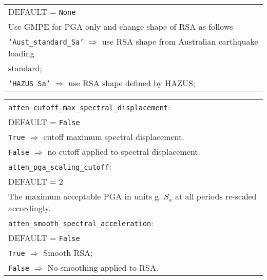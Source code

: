 \begin{tabular}{|p{\textwidth}|}
DEFAULT = \texttt{None} \\
Use GMPE for PGA only and change shape of RSA as follows\\
 \hspace{0.5em} \texttt{`Aust\_standard\_Sa'} $\Rightarrow$
use RSA shape from Australian earthquake loading \\
\hspace{11em} standard; \\
 \hspace{0.5em} \texttt{`HAZUS\_Sa'}  $\Rightarrow$ use RSA shape defined by HAZUS;\\
\hline
\end{tabular}

\begin{tabular}{|p{\textwidth}|}
\hline
 \hspace{0.5em} \texttt{atten\_cutoff\_max\_spectral\_displacement}: \\
DEFAULT = \texttt{False} \\
\hspace{0.5em} \texttt{True} $\Rightarrow$ cutoff maximum spectral displacement. \\
\hspace{0.5em} \texttt{False} $\Rightarrow$ no cutoff applied to spectral displacement. \\
\hline \vspace{0.1em} \texttt{atten\_pga\_scaling\_cutoff}: \\
DEFAULT = 2 \\
The maximum acceptable PGA in units g. $S_a$ at all periods re-scaled accordingly.      \\
\hline \vspace{0.1em}
\texttt{atten\_smooth\_spectral\_acceleration}: \\
DEFAULT = \texttt{False} \\
\hspace{0.5em} \texttt{True} $\Rightarrow$  Smooth RSA; \\
\hspace{0.5em} \texttt{False} $\Rightarrow$  No smoothing applied to RSA. \\
\hline
 \end{tabular}


